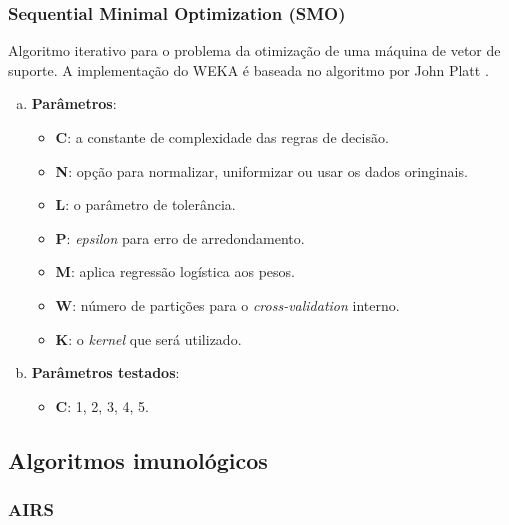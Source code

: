 \subsubsection{Sequential Minimal Optimization (SMO)}

Algoritmo iterativo para o problema da otimização de uma máquina de vetor de suporte. A implementação do WEKA é baseada no algoritmo por John Platt \cite{Platt1998}.

\begin{enumerate}[a)]
    \item \textbf{Parâmetros}:
        \begin{itemize}
            \item \textbf{C}: a constante de complexidade das regras de decisão.
            \item \textbf{N}: opção para normalizar, uniformizar ou usar os dados oringinais.
            \item \textbf{L}: o parâmetro de tolerância.
            \item \textbf{P}: \emph{epsilon} para erro de arredondamento.
            \item \textbf{M}: aplica regressão logística aos pesos.
            \item \textbf{W}: número de partições para o \emph{cross-validation} interno.
            \item \textbf{K}: o \emph{kernel} que será utilizado.
        \end{itemize}
    \item \textbf{Parâmetros testados}:
        \begin{itemize}
            \item \textbf{C}: 1, 2, 3, 4, 5.
        \end{itemize}
\end{enumerate}

\subsection{Algoritmos imunológicos}

\subsubsection{AIRS}

